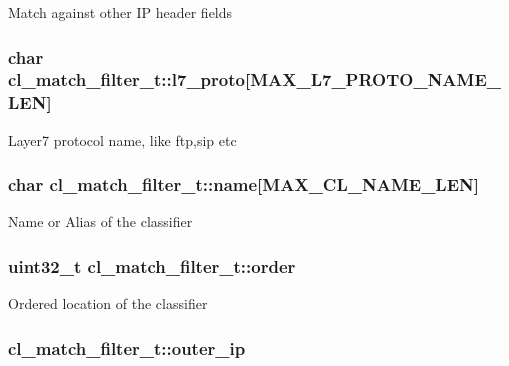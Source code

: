 Match against other I\-P header fields \hypertarget{structcl__match__filter__t_ab5de4e65d81db7ec44acc42904e43d58}{
\subsubsection[{l7\-\_\-proto}]{\setlength{\rightskip}{0pt plus 5cm}char cl\-\_\-match\-\_\-filter\-\_\-t\-::l7\-\_\-proto\mbox{[}{\bf M\-A\-X\-\_\-\-L7\-\_\-\-P\-R\-O\-T\-O\-\_\-\-N\-A\-M\-E\-\_\-\-L\-E\-N}\mbox{]}}}\label{structcl__match__filter__t_ab5de4e65d81db7ec44acc42904e43d58}
Layer7 protocol name, like ftp,sip etc \hypertarget{structcl__match__filter__t_afc0fa04b66e0e2e9427b6f0ef139fafe}{
\subsubsection[{name}]{\setlength{\rightskip}{0pt plus 5cm}char cl\-\_\-match\-\_\-filter\-\_\-t\-::name\mbox{[}{\bf M\-A\-X\-\_\-\-C\-L\-\_\-\-N\-A\-M\-E\-\_\-\-L\-E\-N}\mbox{]}}}\label{structcl__match__filter__t_afc0fa04b66e0e2e9427b6f0ef139fafe}
Name or Alias of the classifier \hypertarget{structcl__match__filter__t_ae41a40e7a69a752ce76c02052af28d81}{
\subsubsection[{order}]{\setlength{\rightskip}{0pt plus 5cm}uint32\-\_\-t cl\-\_\-match\-\_\-filter\-\_\-t\-::order}}\label{structcl__match__filter__t_ae41a40e7a69a752ce76c02052af28d81}
Ordered location of the classifier \hypertarget{structcl__match__filter__t_a346a191513fe31bcadd310ffa61a6ec3}{
\subsubsection[{outer\-\_\-ip}]{ cl\-\_\-match\-\_\-filter\-\_\-t\-::outer\-\_\-ip}}\label{structcl__match__filter__t_a346a191513fe31bcadd310ffa61a6ec3}
